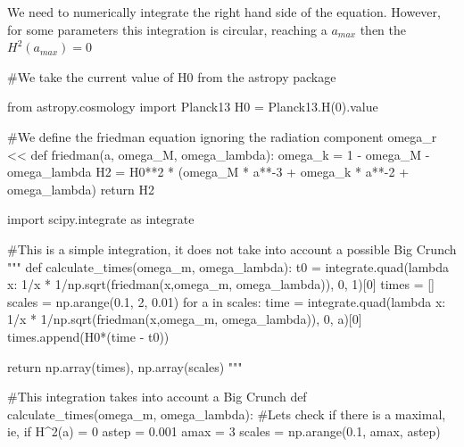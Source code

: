 \documentclass[
  letterpaper,
  DIV=11,
  numbers=noendperiod]{scrreprt}
\newenvironment{Shaded}{\begin{snugshade}}{\end{snugshade}}
\newcommand{\CommentTok}[1]{\textcolor[rgb]{0.37,0.37,0.37}{#1}}
\newcommand{\ControlFlowTok}[1]{\textcolor[rgb]{0.00,0.23,0.31}{#1}}
\newcommand{\DecValTok}[1]{\textcolor[rgb]{0.68,0.00,0.00}{#1}}
\newcommand{\FloatTok}[1]{\textcolor[rgb]{0.68,0.00,0.00}{#1}}
\newcommand{\ImportTok}[1]{\textcolor[rgb]{0.00,0.46,0.62}{#1}}
\newcommand{\KeywordTok}[1]{\textcolor[rgb]{0.00,0.23,0.31}{#1}}
\newcommand{\NormalTok}[1]{\textcolor[rgb]{0.00,0.23,0.31}{#1}}
\newcommand{\OperatorTok}[1]{\textcolor[rgb]{0.37,0.37,0.37}{#1}}
\begin{document}
We need to numerically integrate the right hand side of the equation.
However, for some parameters this integration is circular, reaching a
\(a_{max}\) then the \(H^2(a_{max}) = 0\)

\begin{Shaded}
\begin{Highlighting}[]
\CommentTok{\#We take the current value of H0 from the astropy package}

\ImportTok{from}\NormalTok{ astropy.cosmology }\ImportTok{import}\NormalTok{ Planck13}
\NormalTok{H0 }\OperatorTok{=}\NormalTok{ Planck13.H(}\DecValTok{0}\NormalTok{).value}

\CommentTok{\#We define the friedman equation ignoring the radiation component omega\_r \textless{}\textless{}}
\KeywordTok{def}\NormalTok{ friedman(a, omega\_M, omega\_lambda):}
\NormalTok{    omega\_k }\OperatorTok{=} \DecValTok{1} \OperatorTok{{-}}\NormalTok{ omega\_M }\OperatorTok{{-}}\NormalTok{ omega\_lambda}
\NormalTok{    H2 }\OperatorTok{=}\NormalTok{ H0}\OperatorTok{**}\DecValTok{2} \OperatorTok{*}\NormalTok{ (omega\_M }\OperatorTok{*}\NormalTok{ a}\OperatorTok{**{-}}\DecValTok{3} \OperatorTok{+}\NormalTok{ omega\_k }\OperatorTok{*}\NormalTok{ a}\OperatorTok{**{-}}\DecValTok{2} \OperatorTok{+}\NormalTok{ omega\_lambda)}
    \ControlFlowTok{return}\NormalTok{ H2}

\ImportTok{import}\NormalTok{ scipy.integrate }\ImportTok{as}\NormalTok{ integrate}

\CommentTok{\#This is a simple integration, it does not take into account a possible Big Crunch}
\CommentTok{"""}
\CommentTok{def calculate\_times(omega\_m, omega\_lambda):}
\CommentTok{    t0 = integrate.quad(lambda x: 1/x * 1/np.sqrt(friedman(x,omega\_m, omega\_lambda)), 0, 1)[0]}
\CommentTok{    times = []}
\CommentTok{    scales = np.arange(0.1, 2, 0.01)}
\CommentTok{    for a in scales:}
\CommentTok{        time = integrate.quad(lambda x: 1/x * 1/np.sqrt(friedman(x,omega\_m, omega\_lambda)), 0, a)[0]}
\CommentTok{        times.append(H0*(time {-} t0))  }

\CommentTok{    return np.array(times), np.array(scales)}
\CommentTok{"""}

\CommentTok{\#This integration takes into account a Big Crunch}
\KeywordTok{def}\NormalTok{ calculate\_times(omega\_m, omega\_lambda):}
    \CommentTok{\#Lets check if there is a maximal, ie, if H\^{}2(a) = 0}
\NormalTok{    astep }\OperatorTok{=} \FloatTok{0.001}
\NormalTok{    amax }\OperatorTok{=} \DecValTok{3}
\NormalTok{    scales }\OperatorTok{=}\NormalTok{ np.arange(}\FloatTok{0.1}\NormalTok{, amax, astep)}


\end{Highlighting}
\end{Shaded}
\end{document}
